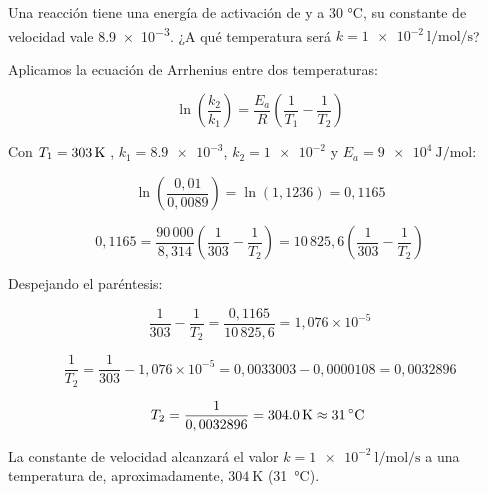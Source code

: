 \begin{exercise}
    Una reacción tiene una energía de activación de  y a 30 °C, su constante de velocidad vale \num{8.9e-3}.
    ¿A qué temperatura será \(k = \SI{1e-2}{\litre\per\mole\per\s}\)?

    \begin{solu}

        Aplicamos la ecuación de Arrhenius entre dos temperaturas:

        \begin{equation*}
            \ln \left( \dfrac{k_2}{k_1} \right) = \dfrac{E_a}{R} \left( \dfrac{1}{T_1} - \dfrac{1}{T_2} \right)
        \end{equation*}

        Con \(T_1 = \temperatura[k]{303}\), \(k_1 = \num{8.9e-3}\), \(k_2 = \num{1e-2}\) y \(E_a = \SI{9e4}{\joule\per\mole}\):

        \begin{equation*}
            \ln \left( \dfrac{0,01}{0,0089} \right) = \ln(1,1236) = 0,1165
        \end{equation*}

        \begin{equation*}
            0,1165 = \dfrac{90\,000}{8,314} \left( \dfrac{1}{303} - \dfrac{1}{T_2} \right) = 10\,825,6 \left( \dfrac{1}{303} - \dfrac{1}{T_2} \right)
        \end{equation*}

        Despejando el paréntesis:

        \begin{equation*}
            \dfrac{1}{303} - \dfrac{1}{T_2} = \dfrac{0,1165}{10\,825,6} = 1,076 \times 10^{-5}
        \end{equation*}

        \begin{equation*}
            \dfrac{1}{T_2} = \dfrac{1}{303} - 1,076 \times 10^{-5} = 0,0033003 - 0,0000108 = 0,0032896
        \end{equation*}

        \begin{equation*}
            T_2 = \dfrac{1}{0,0032896} = \SI{304.0}{\kelvin} \approx \temperatura[c]{31}
        \end{equation*}

        La constante de velocidad alcanzará el valor \(k = \SI{1e-2}{\litre\per\mole\per\s}\) a una temperatura de, aproximadamente, \(\SI{304}{\kelvin}\) (\SI{31}{\celsius}).

    \end{solu}
\end{exercise}

